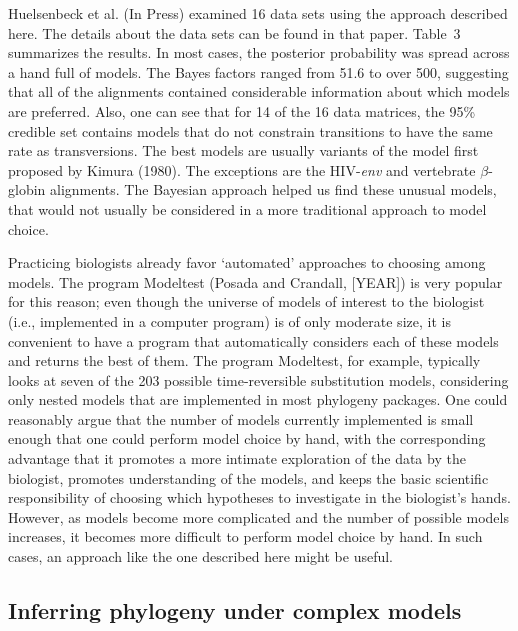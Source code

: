 \documentclass{svmult}
\begin{document}
Huelsenbeck et al. (In Press) examined 16 data sets using the approach described here. The details
about the data sets can be found in that paper. Table~3 summarizes the results. In most cases, the
posterior probability was spread across a hand full of models. The Bayes factors ranged from 51.6
to over 500, suggesting that all of the alignments contained considerable information about which
models are preferred.  Also, one can see that for 14 of the 16 data matrices, the 95\% credible set
contains models that do not constrain transitions to have the same rate as transversions. The best
models are usually variants of the model first proposed by Kimura (1980).  The exceptions are the
HIV-{\it env} and vertebrate $\beta$-globin alignments. The Bayesian approach helped us find these
unusual models, that would not usually be considered in a more traditional approach to model
choice.

Practicing biologists already favor `automated' approaches to choosing among models. The program
Modeltest (Posada and Crandall, [YEAR]) is very popular for this reason; even though the universe
of models of interest to the biologist (i.e., implemented in a computer program) is of only
moderate size, it is convenient to have a program that automatically considers each of these models
and returns the best of them. The program Modeltest, for example, typically looks at seven of the
203 possible time-reversible substitution models, considering only nested models that are
implemented in most phylogeny packages. One could reasonably argue that the number of models
currently implemented is small enough that one could perform model choice by hand, with the
corresponding advantage that it promotes a more intimate exploration of the data by the biologist,
promotes understanding of the models, and keeps the basic scientific responsibility of choosing
which hypotheses to investigate in the biologist's hands. However, as models become more
complicated and the number of possible models increases, it becomes more difficult to perform model
choice by hand. In such cases, an approach like the one described here might be useful.

\subsection{Inferring phylogeny under complex models}
\end{document}
